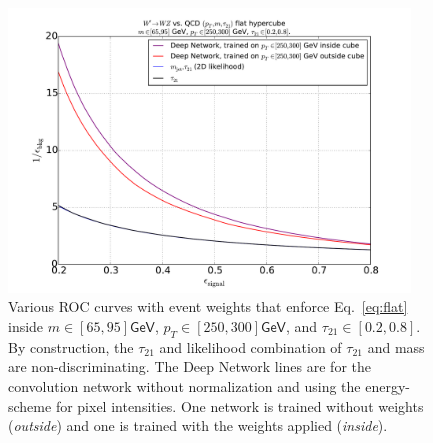 \begin{figure}[htbp]
  \centering
  \includegraphics[width=0.95\textwidth]{figures/roc-cube-inside.pdf}
  \caption{Various ROC curves with event weights that enforce Eq.~\ref{eq:flat} inside $m\in[65, 95]\mathsf{GeV}$,  $p_T\in[250, 300]\mathsf{GeV}$, and  $\tau_{21}\in[0.2, 0.8]$.  By construction, the $\tau_{21}$ and likelihood combination of $\tau_{21}$ and mass are non-discriminating.  The Deep Network lines are for the convolution network without normalization and using the energy-scheme for pixel intensities.  One network is trained without weights ({\it outside}) and one is trained with the weights applied ({\it inside}).}
  \label{fig:rocCube}
\end{figure}

